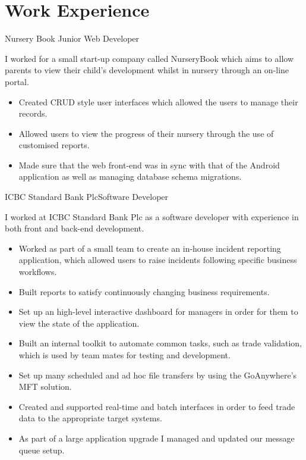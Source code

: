 \documentclass[10pt,a4paper]{moderncv}
\begin{document}
        \section{Work Experience}
        {Nursery Book}
        {Junior Web Developer}
        {}
        {}
        {
        I worked for a small start-up company called NurseryBook which aims to allow parents to view their child's development whilst in nursery through an on-line portal.
        \begin{itemize}
            \item Created CRUD style user interfaces which allowed the users to manage their records.
            \item Allowed users to view the progress of their nursery through the use of customised reports.
            \item Made sure that the web front-end was in sync with that of the Android application as well as managing database schema migrations.
        \end{itemize}
        }
    
        {ICBC Standard Bank Plc}{Software Developer}{}{}
        {
        I worked at ICBC Standard Bank Plc as a software developer with experience in both front and back-end development.
        \begin{itemize}
            \item Worked as part of a small team to create an in-house incident reporting application, which allowed users to raise incidents following specific business workflows.
            \item Built reports to satisfy continuously changing business requirements.
            \item Set up an high-level interactive dashboard for managers in order for them to view the state of the application.
            \item Built an internal toolkit to automate common tasks, such as trade validation, which is used by team mates for testing and development.
            \item Set up many scheduled and ad hoc file transfers by using the GoAnywhere's MFT solution.
            \item Created and supported real-time and batch interfaces in order to feed trade data to the appropriate target systems.
            \item As part of a large application upgrade I managed and updated our message queue setup.
        \end{itemize}
        }
\end{document}
